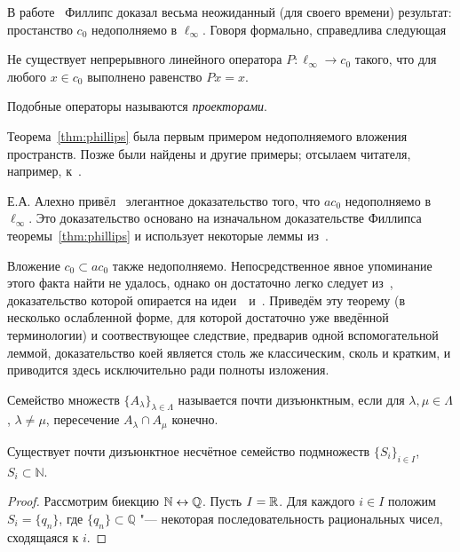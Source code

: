 \label{sec:noncomplementarity}

В работе~\cite{phillips1940linear} Филлипс доказал весьма неожиданный (для своего времени) результат:
простанство $c_0$ недополняемо в $\ell_\infty$.
Говоря формально, справедлива следующая


\begin{theorem}[Филлипса]
	\label{thm:phillips}
	Не существует непрерывного линейного оператора $P: \ell_\infty \to c_0$ такого, что для любого
	$x \in c_0$ выполнено равенство $Px =x$.
\end{theorem}
Подобные операторы называются \emph{проекторами}.

Теорема~\ref{thm:phillips} была первым примером недополняемого вложения пространств.
Позже были найдены и другие примеры;
отсылаем читателя, например, к~\cite{lindenstrauss1979classical}.

Е.А. Алехно привёл~\cite[Theorem 8]{alekhno2006propertiesII} элегантное доказательство
того, что $ac_0$ недополняемо в $\ell_\infty$.
Это доказательство основано на изначальном доказательстве Филлипса теоремы~\ref{thm:phillips}
и использует некоторые леммы из~\cite{phillips1940linear}.

Вложение $c_0 \subset ac_0$ также недополняемо.
Непосредственное явное упоминание этого факта найти не удалось, однако он достаточно легко следует из~\cite[теорема 4]{ASSU2},
доказательство которой опирается на идеи~\cite{whitley1968projecting}~и~\cite[Theorem 6.9]{Carothers}.
Приведём эту теорему (в несколько ослабленной форме, для которой достаточно уже введённой терминологии)
и соотвествующее следствие, предварив одной вспомогательной леммой, доказательство коей является столь же классическим, сколь и кратким,
и приводится здесь исключительно ради полноты изложения.

\begin{definition}
	Семейство множеств $\{A_\lambda\}_{\lambda \in \Lambda}$ называется почти дизъюнктным,
	если для $\lambda, \mu \in \Lambda$, $\lambda \ne \mu$,
	пересечение $A_\lambda \cap A_\mu$ конечно.
\end{definition}

\begin{lemma}
	\label{lem:uncountable_subsets_of_N_with_finite_intersections}
	Существует почти дизъюнктное несчётное семейство подмножеств $\{S_i\}_{i\in I}$, $S_i \subset \mathbb{N}$.
\end{lemma}

\begin{proof}
	Рассмотрим биекцию $\mathbb{N} \leftrightarrow \mathbb{Q}$.
	Пусть $I = \mathbb{R}$.
	Для каждого $i\in I$ положим $S_i = \{q_n\}$,
	где $\{q_n\} \subset \mathbb{Q}$ "--- некоторая последовательность рациональных чисел,
	сходящаяся к $i$.
\end{proof}

